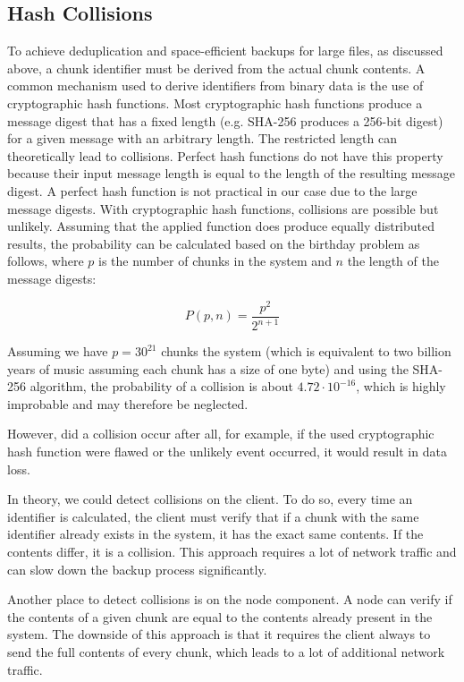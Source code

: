 \subsection{Hash Collisions}\label{sec:hash-collisions}
To achieve deduplication and space-efficient backups for large files, as discussed above, a chunk identifier must be derived from the actual chunk contents. 
A common mechanism used to derive identifiers from binary data is the use of cryptographic hash functions. Most cryptographic hash functions produce a message digest that has a fixed length (e.g. SHA-256\cite{sha-256} produces a 256-bit digest) for a given message with an arbitrary length. The restricted length can theoretically lead to collisions.
Perfect hash functions do not have this property because their input message length is equal to the length of the resulting message digest. A perfect hash function is not practical in our case due to the large message digests.
With cryptographic hash functions, collisions are possible but unlikely. Assuming that the applied function does produce equally distributed results, the probability can be calculated based on the birthday problem\cite{birthday-attack} as follows, where $p$ is the number of chunks in the system and $n$ the length of the message digests:

\[
P(p, n) = \frac{p^2}{2^{n+1}}
\]

Assuming we have $p=30^{21}$ chunks the system (which is equivalent to two billion years of music assuming each chunk has a size of one byte\cite{seagate-zetabyte}) and using the SHA-256 algorithm, the probability of a collision is about $4.72 \cdot 10^{-16}$, which is highly improbable and may therefore be neglected.

However, did a collision occur after all, for example, if the used cryptographic hash function were flawed or the unlikely event occurred, it would result in data loss.

In theory, we could detect collisions on the \gls{client}. To do so, every time an identifier is calculated, the \gls{client} must verify that if a chunk with the same identifier already exists in the system, it has the exact same contents. If the contents differ, it is a collision. This approach requires a lot of network traffic and can slow down the backup process significantly.

Another place to detect collisions is on the \gls{node} component. A \gls{node} can verify if the contents of a given chunk are equal to the contents already present in the system. The downside of this approach is that it requires the \gls{client} always to send the full contents of every chunk, which leads to a lot of additional network traffic.

